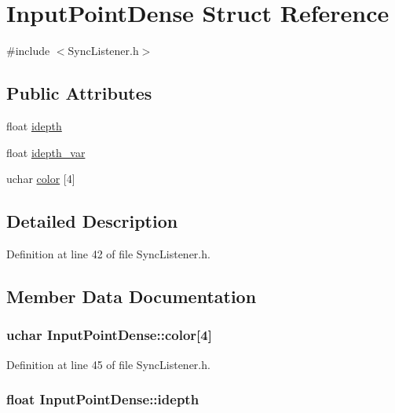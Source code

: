 \hypertarget{structInputPointDense}{\section{\-Input\-Point\-Dense \-Struct \-Reference}
\label{structInputPointDense}
}


{\ttfamily \#include $<$\-Sync\-Listener.\-h$>$}

\subsection*{\-Public \-Attributes}
\begin{DoxyCompactItemize}
\item 
float \hyperlink{structInputPointDense_ac719189837460d806d6748847502a7ba}{idepth}
\item 
float \hyperlink{structInputPointDense_adb860b5e78f47b2d7e073559e725dda4}{idepth\-\_\-var}
\item 
uchar \hyperlink{structInputPointDense_afa5a25bb99b8216f729dc8b1876248ff}{color} \mbox{[}4\mbox{]}
\end{DoxyCompactItemize}


\subsection{\-Detailed \-Description}


\-Definition at line 42 of file \-Sync\-Listener.\-h.



\subsection{\-Member \-Data \-Documentation}
\hypertarget{structInputPointDense_afa5a25bb99b8216f729dc8b1876248ff}{
\subsubsection[{color}]{\setlength{\rightskip}{0pt plus 5cm}uchar {\bf \-Input\-Point\-Dense\-::color}\mbox{[}4\mbox{]}}}\label{structInputPointDense_afa5a25bb99b8216f729dc8b1876248ff}


\-Definition at line 45 of file \-Sync\-Listener.\-h.

\hypertarget{structInputPointDense_ac719189837460d806d6748847502a7ba}{
\subsubsection[{idepth}]{\setlength{\rightskip}{0pt plus 5cm}float {\bf \-Input\-Point\-Dense\-::idepth}}}\label{structInputPointDense_ac719189837460d806d6748847502a7ba}


